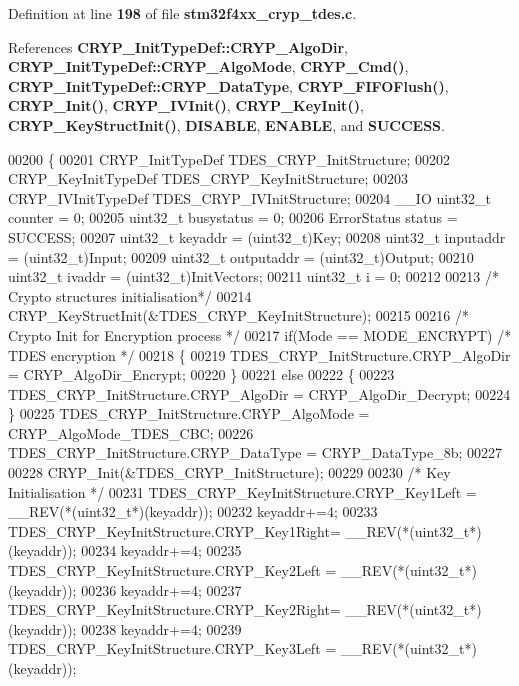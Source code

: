 Definition at line \textbf{ 198} of file \textbf{ stm32f4xx\+\_\+cryp\+\_\+tdes.\+c}.



References \textbf{ C\+R\+Y\+P\+\_\+\+Init\+Type\+Def\+::\+C\+R\+Y\+P\+\_\+\+Algo\+Dir}, \textbf{ C\+R\+Y\+P\+\_\+\+Init\+Type\+Def\+::\+C\+R\+Y\+P\+\_\+\+Algo\+Mode}, \textbf{ C\+R\+Y\+P\+\_\+\+Cmd()}, \textbf{ C\+R\+Y\+P\+\_\+\+Init\+Type\+Def\+::\+C\+R\+Y\+P\+\_\+\+Data\+Type}, \textbf{ C\+R\+Y\+P\+\_\+\+F\+I\+F\+O\+Flush()}, \textbf{ C\+R\+Y\+P\+\_\+\+Init()}, \textbf{ C\+R\+Y\+P\+\_\+\+I\+V\+Init()}, \textbf{ C\+R\+Y\+P\+\_\+\+Key\+Init()}, \textbf{ C\+R\+Y\+P\+\_\+\+Key\+Struct\+Init()}, \textbf{ D\+I\+S\+A\+B\+LE}, \textbf{ E\+N\+A\+B\+LE}, and \textbf{ S\+U\+C\+C\+E\+SS}.


\begin{DoxyCode}
00200 \{
00201   CRYP_InitTypeDef TDES\_CRYP\_InitStructure;
00202   CRYP_KeyInitTypeDef TDES\_CRYP\_KeyInitStructure;
00203   CRYP_IVInitTypeDef TDES\_CRYP\_IVInitStructure;
00204   \_\_IO uint32\_t counter = 0;
00205   uint32\_t busystatus = 0;
00206   ErrorStatus status = SUCCESS;
00207   uint32\_t keyaddr    = (uint32\_t)Key;
00208   uint32\_t inputaddr  = (uint32\_t)Input;
00209   uint32\_t outputaddr = (uint32\_t)Output;
00210   uint32\_t ivaddr     = (uint32\_t)InitVectors;
00211   uint32\_t i = 0;
00212 
00213   \textcolor{comment}{/* Crypto structures initialisation*/}
00214   CRYP_KeyStructInit(&TDES\_CRYP\_KeyInitStructure);
00215 
00216   \textcolor{comment}{/* Crypto Init for Encryption process */}
00217   \textcolor{keywordflow}{if}(Mode == MODE_ENCRYPT) \textcolor{comment}{/* TDES encryption */}
00218   \{
00219     TDES\_CRYP\_InitStructure.CRYP_AlgoDir = CRYP_AlgoDir_Encrypt;
00220   \}
00221   \textcolor{keywordflow}{else}
00222   \{
00223     TDES\_CRYP\_InitStructure.CRYP_AlgoDir = CRYP_AlgoDir_Decrypt;
00224   \}
00225   TDES\_CRYP\_InitStructure.CRYP_AlgoMode = CRYP_AlgoMode_TDES_CBC;
00226   TDES\_CRYP\_InitStructure.CRYP_DataType = CRYP_DataType_8b;
00227 
00228   CRYP_Init(&TDES\_CRYP\_InitStructure);
00229 
00230   \textcolor{comment}{/* Key Initialisation */}
00231   TDES\_CRYP\_KeyInitStructure.CRYP_Key1Left = \_\_REV(*(uint32\_t*)(keyaddr));
00232   keyaddr+=4;
00233   TDES\_CRYP\_KeyInitStructure.CRYP_Key1Right= \_\_REV(*(uint32\_t*)(keyaddr));
00234   keyaddr+=4;
00235   TDES\_CRYP\_KeyInitStructure.CRYP_Key2Left = \_\_REV(*(uint32\_t*)(keyaddr));
00236   keyaddr+=4;
00237   TDES\_CRYP\_KeyInitStructure.CRYP_Key2Right= \_\_REV(*(uint32\_t*)(keyaddr));
00238   keyaddr+=4;
00239   TDES\_CRYP\_KeyInitStructure.CRYP_Key3Left = \_\_REV(*(uint32\_t*)(keyaddr));

\end{DoxyCode}
